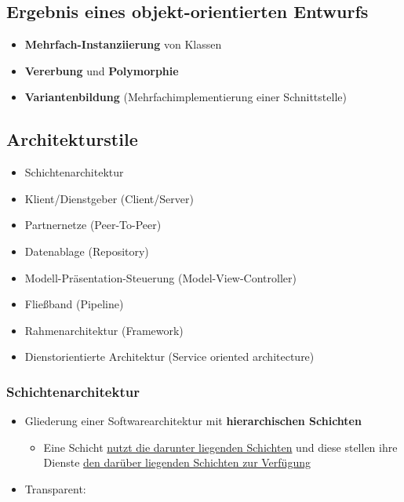 \documentclass[parskip=full, 12pt]{scrartcl}
\begin{document}
		\subsection{Ergebnis eines objekt-orientierten Entwurfs}
		
			\begin{itemize}
				\item \textbf{Mehrfach-Instanziierung} von Klassen
				\item \textbf{Vererbung} und \textbf{Polymorphie}
				\item \textbf{Variantenbildung} (Mehrfachimplementierung einer Schnittstelle)
			\end{itemize}
	
		\newpage
		\subsection{Architekturstile}
		
			\begin{itemize}
				\item Schichtenarchitektur
				\item Klient/Dienstgeber (Client/Server)
				\item Partnernetze (Peer-To-Peer)
				\item Datenablage (Repository)
				\item Modell-Präsentation-Steuerung (Model-View-Controller)
				\item Fließband (Pipeline)
				\item Rahmenarchitektur (Framework)
				\item Dienstorientierte Architektur (Service oriented architecture)
			\end{itemize}
		
			\subsubsection{Schichtenarchitektur}
			
				\begin{itemize}
					\item Gliederung einer Softwarearchitektur mit \textbf{hierarchischen Schichten}
					\begin{itemize}
						\item Eine Schicht \underline{nutzt die darunter liegenden Schichten}  und diese \newline stellen ihre Dienste \underline{den darüber liegenden Schichten zur Verfügung}
					\end{itemize}
					\item Transparent:
				\end{itemize}		
				
\end{document}
